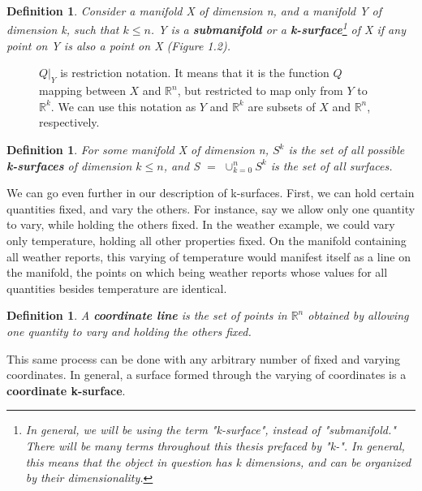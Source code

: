 \documentclass{book}
\newtheorem{defn}[equation]{Definition}
\begin{document}
\begin{defn}
	Consider a manifold X of dimension n, and a manifold Y of dimension k, such that $k \leq n$. Y is a \textbf{submanifold} or a \textbf{k-surface}\footnote{In general, we will be using the term "k-surface", instead of "submanifold." There will be many terms throughout this thesis prefaced by "k-". In general, this means that the object in question has k dimensions, and can be organized by their dimensionality.} of X if any point on Y is also a point on X (Figure 1.2). 
\end{defn}


\begin{figure}[h]
\begin{center}
\end{center}
\caption{$Q|_Y$ is restriction notation. It means that it is the function $Q$ mapping between $X$ and $\mathbb{R}^n$, but restricted to map only from $Y$ to $\mathbb{R}^k$. We can use this notation as $Y$ and $\mathbb{R}^k$ are subsets of $X$ and $\mathbb{R}^n$, respectively.}
\end{figure}


\begin{defn}
	For some manifold X of dimension n, $S^k$ is the set of all possible \textbf{k-surfaces} of dimension $k \leq n$, and S $=$ $\cup^n_{k=0}S^k$ is the set of all surfaces. 
\end{defn}


We can go even further in our description of k-surfaces. First, we can hold certain quantities fixed, and vary the others. For instance, say we allow only one quantity to vary, while holding the others fixed. In the weather example, we could vary only temperature, holding all other properties fixed. On the manifold containing all weather reports, this varying of temperature would manifest itself as a line on the manifold, the points on which being weather reports whose values for all quantities besides temperature are identical. 
\begin{defn}
	A \textbf{coordinate line} is the set of points in $\mathbb{R}^n$ obtained by allowing one quantity to vary and holding the others fixed. 
\end{defn}

This same process can be done with any arbitrary number of fixed and varying coordinates. In general, a surface formed through the varying of coordinates is a \textbf{coordinate k-surface}. 
\end{document}
